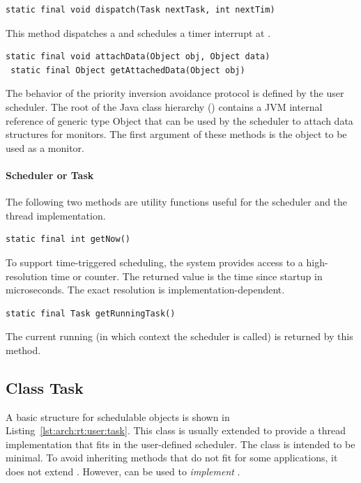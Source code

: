 \begin{lstlisting}[emph=dispatch]
static final void dispatch(Task nextTask, int nextTim)
\end{lstlisting}
This method dispatches a  and schedules a timer interrupt
at .

\begin{lstlisting}[emph={attachData,getAttachedData}]
 static final void attachData(Object obj, Object data)
 static final Object getAttachedData(Object obj)
\end{lstlisting}
The behavior of the priority inversion avoidance protocol is defined
by the user scheduler. The root of the Java class hierarchy
() contains a JVM internal reference of
generic type Object that can be used by the scheduler to attach data
structures for monitors. The first argument of these methods is the
object to be used as a monitor.

\paragraph{Scheduler or Task}

The following two methods are utility functions useful for the
scheduler and the thread implementation.

\begin{lstlisting}[emph=getNow]
static final int getNow()
\end{lstlisting}
To support time-triggered scheduling, the system provides access to
a high-resolution time or counter. The returned value is the time
since startup in microseconds. The exact resolution is
implementation-dependent.

\begin{lstlisting}[emph=getRunningTask]
static final Task getRunningTask()
\end{lstlisting}
The current running  (in which context the scheduler is
called) is returned by this method.

\subsection{Class Task}

A basic structure for schedulable objects is shown in
Listing~\ref{lst:arch:rt:user:task}. This class is usually extended
to provide a thread implementation that fits in the user-defined
scheduler. The class  is intended to be minimal. To avoid
inheriting methods that do not fit for some applications, it does not
extend . However,  can be used to
\emph{implement} .

